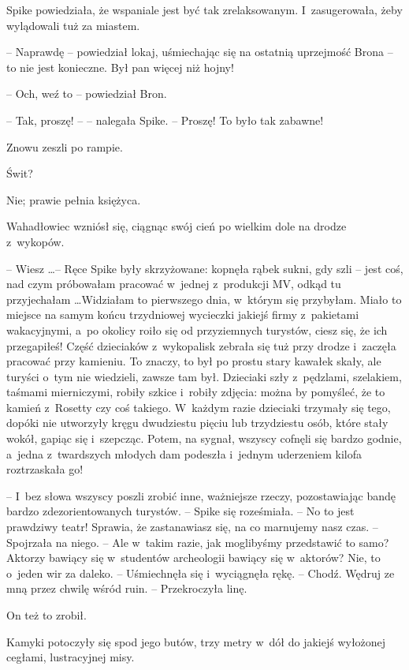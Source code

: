 \documentclass[oneside,polish,11pt,rmheadings]{mwbk}
\begin{document}
Spike powiedziała, że wspaniale jest być tak zrelaksowanym. I~zasugerowała, żeby wylądowali tuż za miastem. 

-- Naprawdę -- powiedział lokaj, uśmiechając się na ostatnią uprzejmość Brona -- to nie jest konieczne. Był pan więcej niż hojny! 

-- Och, weź to -- powiedział Bron. 

-- Tak, proszę! --  -- nalegała Spike. -- Proszę! To było tak zabawne! 

Znowu zeszli po rampie. 

Świt? 

Nie; prawie pełnia księżyca. 

Wahadłowiec wzniósł się, ciągnąc swój cień po wielkim dole na drodze z~wykopów. 

-- Wiesz \ldots  -- Ręce Spike były skrzyżowane: kopnęła rąbek sukni, gdy szli -- jest coś, nad czym próbowałam pracować w~jednej z~produkcji MV, odkąd tu przyjechałam \ldots   Widziałam to pierwszego dnia, w~którym się przybyłam. Miało to miejsce na samym końcu trzydniowej wycieczki jakiejś firmy z~pakietami wakacyjnymi, a~po okolicy roiło się od przyziemnych turystów, ciesz się, że ich przegapiłeś! Część dzieciaków z~wykopalisk zebrała się tuż przy drodze i~zaczęła pracować przy kamieniu. To znaczy, to był po prostu stary kawałek skały, ale turyści o~tym nie wiedzieli, zawsze tam był. Dzieciaki szły z~pędzlami, szelakiem, taśmami mierniczymi, robiły szkice i~robiły zdjęcia: można by pomyśleć, że to kamień z~Rosetty czy coś takiego. W~każdym razie dzieciaki trzymały się tego, dopóki nie utworzyły kręgu dwudziestu pięciu lub trzydziestu osób, które stały wokół, gapiąc się i~szepcząc. Potem, na sygnał, wszyscy cofnęli się bardzo godnie, a~jedna z~twardszych młodych dam podeszła i~jednym uderzeniem kilofa roztrzaskała go! 

-- I~bez słowa wszyscy poszli zrobić inne, ważniejsze rzeczy, pozostawiając bandę bardzo zdezorientowanych turystów. --  Spike się roześmiała. -- No to jest prawdziwy teatr! Sprawia, że zastanawiasz się, na co marnujemy nasz czas. -- Spojrzała na niego. -- Ale w~takim razie, jak moglibyśmy przedstawić to samo? Aktorzy bawiący się w~studentów archeologii bawiący się w~aktorów? Nie, to o~jeden wir za daleko. -- Uśmiechnęła się i~wyciągnęła rękę. -- Chodź. Wędruj ze mną przez chwilę wśród ruin. -- Przekroczyła linę. 

On też to zrobił. 

Kamyki potoczyły się spod jego butów, trzy metry w~dół do jakiejś wyłożonej cegłami, lustracyjnej misy. 
\end{document}
